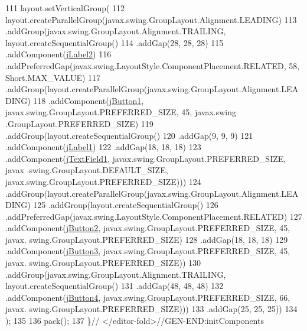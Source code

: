 \begin{DoxyCode}
111         layout.setVerticalGroup(
112             layout.createParallelGroup(javax.swing.GroupLayout.Alignment.LEADING)
113             .addGroup(javax.swing.GroupLayout.Alignment.TRAILING, layout.createSequentialGroup()
114                 .addGap(28, 28, 28)
115                 .addComponent(\mbox{\hyperlink{classpecl6part2_1_1_modulo_controlador_a322924ffd4409beca92e1f9ef6d108e5}{jLabel2}})
116                 .addPreferredGap(javax.swing.LayoutStyle.ComponentPlacement.RELATED, 58, Short.MAX\_VALUE)
117                 .addGroup(layout.createParallelGroup(javax.swing.GroupLayout.Alignment.LEADING)
118                     .addComponent(\mbox{\hyperlink{classpecl6part2_1_1_modulo_controlador_acdf6c079fea2dc2a66c8b0e5f4ec10e3}{jButton1}}, javax.swing.GroupLayout.PREFERRED\_SIZE, 45, javax.swing
      .GroupLayout.PREFERRED\_SIZE)
119                     .addGroup(layout.createSequentialGroup()
120                         .addGap(9, 9, 9)
121                         .addComponent(\mbox{\hyperlink{classpecl6part2_1_1_modulo_controlador_a8f34e28c463eece3072679131fe0c448}{jLabel1}})
122                         .addGap(18, 18, 18)
123                         .addComponent(\mbox{\hyperlink{classpecl6part2_1_1_modulo_controlador_a7a8c12d92360f65dd601091c44ef20d9}{jTextField1}}, javax.swing.GroupLayout.PREFERRED\_SIZE, javax
      .swing.GroupLayout.DEFAULT\_SIZE, javax.swing.GroupLayout.PREFERRED\_SIZE)))
124                 .addGroup(layout.createParallelGroup(javax.swing.GroupLayout.Alignment.LEADING)
125                     .addGroup(layout.createSequentialGroup()
126                         .addPreferredGap(javax.swing.LayoutStyle.ComponentPlacement.RELATED)
127                         .addComponent(\mbox{\hyperlink{classpecl6part2_1_1_modulo_controlador_a38f1d50c40672c81a4ec1fa0a5fa1ca9}{jButton2}}, javax.swing.GroupLayout.PREFERRED\_SIZE, 45, javax.
      swing.GroupLayout.PREFERRED\_SIZE)
128                         .addGap(18, 18, 18)
129                         .addComponent(\mbox{\hyperlink{classpecl6part2_1_1_modulo_controlador_a0e4337a4107a44ac33ceb447ee056f59}{jButton3}}, javax.swing.GroupLayout.PREFERRED\_SIZE, 45, javax.
      swing.GroupLayout.PREFERRED\_SIZE))
130                     .addGroup(javax.swing.GroupLayout.Alignment.TRAILING, layout.createSequentialGroup()
131                         .addGap(48, 48, 48)
132                         .addComponent(\mbox{\hyperlink{classpecl6part2_1_1_modulo_controlador_a0fd427b07850c91ef7c49d42321b6ec4}{jButton4}}, javax.swing.GroupLayout.PREFERRED\_SIZE, 66, javax.
      swing.GroupLayout.PREFERRED\_SIZE)))
133                 .addGap(25, 25, 25))
134         );
135 
136         pack();
137     \}\textcolor{comment}{// </editor-fold>//GEN-END:initComponents}
\end{DoxyCode}
\mbox{\label{classpecl6part2_1_1_modulo_controlador_a5d79b80be4cc9669c8ce67196182e943}} 
